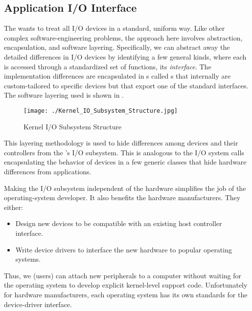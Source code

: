 \subsection{Application I/O Interface}\label{subsec:Application_IO_Interface}
The  wants to treat all I/O devices in a standard, uniform way.
Like other complex software-engineering problems, the approach here involves abstraction, encapsulation, and software layering.
Specifically, we can abstract away the detailed differences in I/O devices by identifying a few general kinds, where each is accessed through a standardized set of functions, its \emph{interface}.
The implementation differences are encapsulated in s called s that internally are custom-tailored to specific devices but that export one of the standard interfaces.
The software layering used is shown in .

\begin{figure}[h!tbp]
  \centering
  \texttt{[image: ./Kernel\_IO\_Subsystem\_Structure.jpg]}
  \caption{Kernel I/O Subsystem Structure}
  \label{fig:Kernel_IO_Subsystem_Structure}
\end{figure}

This layering methodology is used to hide differences among devices and their controllers from the 's I/O subsystem.
This is analogous to the I/O system calls encapsulating the behavior of devices in a few generic classes that hide hardware differences from applications.

Making the I/O subsystem independent of the hardware simplifies the job of the operating-system developer.
It also benefits the hardware manufacturers.
They either:
\begin{itemize}[noitemsep]
\item Design new devices to be compatible with an existing host controller interface.
\item Write device drivers to interface the new hardware to popular operating systems.
\end{itemize}

Thus, we (users) can attach new peripherals to a computer without waiting for the operating system to develop explicit kernel-level support code.
Unfortunately for hardware manufacturers, each operating system has its own standards for the device-driver interface.

